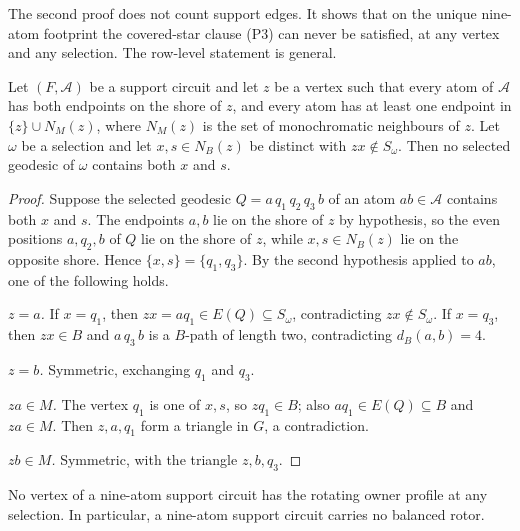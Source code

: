 The second proof does not count support edges. It shows that on the
unique nine-atom footprint the covered-star clause (P3) can never be
satisfied, at any vertex and any selection. The row-level statement is
general.

\begin{theorem}\label{thm:t3-emptystar}
Let \((F,\mathcal A)\) be a support circuit and let \(z\) be a vertex
such that every atom of \(\mathcal A\) has both endpoints on the shore
of \(z\), and every atom has at least one endpoint in
\(\{z\}\cup N_M(z)\), where \(N_M(z)\) is the set of monochromatic
neighbours of \(z\). Let \(\omega\) be a selection and let
\(x,s\in N_B(z)\) be distinct with \(zx\notin S_\omega\). Then no
selected geodesic of \(\omega\) contains both \(x\) and \(s\).
\end{theorem}

\begin{proof}
Suppose the selected geodesic \(Q=a\,q_1\,q_2\,q_3\,b\) of an atom
\(ab\in\mathcal A\) contains both \(x\) and \(s\). The endpoints
\(a,b\) lie on the shore of \(z\) by hypothesis, so the even positions
\(a,q_2,b\) of \(Q\) lie on the shore of \(z\), while
\(x,s\in N_B(z)\) lie on the opposite shore. Hence
\(\{x,s\}=\{q_1,q_3\}\). By the second hypothesis applied to \(ab\),
one of the following holds.

\emph{\(z=a\).} If \(x=q_1\), then \(zx=aq_1\in E(Q)\subseteq
S_\omega\), contradicting \(zx\notin S_\omega\). If \(x=q_3\), then
\(zx\in B\) and \(a\,q_3\,b\) is a \(B\)-path of length two,
contradicting \(d_B(a,b)=4\).

\emph{\(z=b\).} Symmetric, exchanging \(q_1\) and \(q_3\).

\emph{\(za\in M\).} The vertex \(q_1\) is one of \(x,s\), so
\(zq_1\in B\); also \(aq_1\in E(Q)\subseteq B\) and \(za\in M\). Then
\(z,a,q_1\) form a triangle in \(G\), a contradiction.

\emph{\(zb\in M\).} Symmetric, with the triangle \(z,b,q_3\).
\end{proof}

\begin{corollary}\label{cor:t3-second}
No vertex of a nine-atom support circuit has the rotating owner
profile at any selection. In particular, a nine-atom support circuit
carries no balanced rotor.
\end{corollary}

